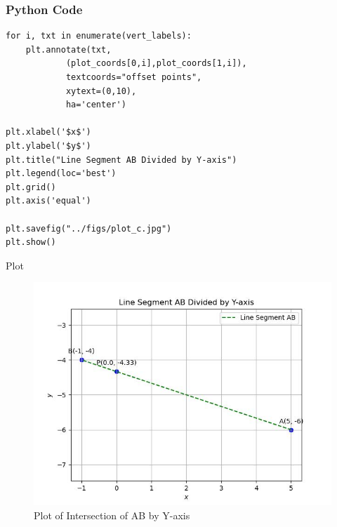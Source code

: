 \documentclass{beamer}
\begin{document}
\begin{frame}[fragile]
    \frametitle{Python Code}
    \begin{lstlisting}
for i, txt in enumerate(vert_labels):
    plt.annotate(txt,
            (plot_coords[0,i],plot_coords[1,i]),
            textcoords="offset points",
            xytext=(0,10),
            ha='center')

plt.xlabel('$x$')
plt.ylabel('$y$')
plt.title("Line Segment AB Divided by Y-axis")
plt.legend(loc='best')
plt.grid()
plt.axis('equal')

plt.savefig("../figs/plot_c.jpg")
plt.show()
    \end{lstlisting}
\end{frame}

\begin{frame}{Plot}
    \begin{figure}
        \centering
        \includegraphics[width=0.5\columnwidth]{../figs/plot_c.jpg}
        \caption{Plot of Intersection of AB by Y-axis}
        \label{fig:fig}
    \end{figure}
\end{frame}
\end{document}
